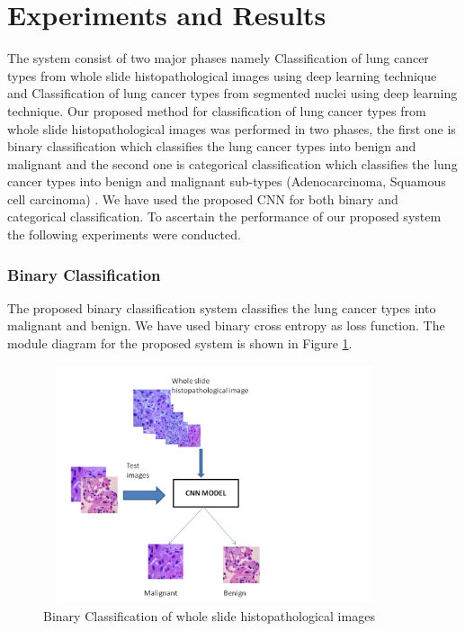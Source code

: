\documentclass[conference]{IEEEtran}
\begin{document}
\section{Experiments and Results}
The system consist of two major phases namely Classification of lung cancer types from whole slide histopathological images using deep learning technique and Classification of lung cancer types from segmented nuclei using deep learning technique. Our proposed method for classification of lung cancer types from whole slide histopathological images was performed in two phases, the first one is binary classification which classifies the lung cancer types into benign and malignant and the second one is categorical classification which classifies the lung cancer types into benign and malignant sub-types (Adenocarcinoma, Squamous cell carcinoma) . We have used the proposed CNN for both binary and categorical classification.
To ascertain the performance of our proposed system the following experiments were conducted.



\subsubsection{Binary Classification}
The proposed binary classification system classifies the lung cancer types into malignant and benign. We have used binary cross entropy as loss function. The module diagram for the proposed system is shown in Figure \ref{fig9}.\newline
\begin{figure}[htbp]
\centerline{\includegraphics[width=10cm, height=7cm]{./figures/pic1a.png}}
\caption{Binary Classification of whole slide histopathological images}
\label{fig9}
\end{figure}
\end{document}
